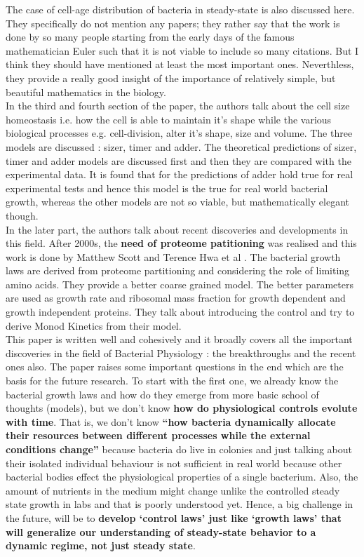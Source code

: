 \documentclass[12pt]{article}
\begin{document}
	The case of cell-age distribution of bacteria in steady-state is also discussed here. They specifically do not mention any papers; they rather say that the work is done by so many people starting from the early days of the famous mathematician Euler such that it is not viable to include so many citations. But I think they should have mentioned at least the most important ones. Neverthless, they provide a really good insight of the importance of relatively simple, but beautiful mathematics in the biology.\\
	
	In the third and fourth section of the paper, the authors talk about the cell size homeostasis i.e. how the cell is able to maintain it's shape while the various biological processes e.g. cell-division, alter it's shape, size and volume. The three models are discussed : sizer, timer and adder. The theoretical predictions of sizer, timer and adder models are discussed first and then they are compared with the experimental data. It is found that for the predictions of adder hold true for real experimental tests and hence this model is the true for real world bacterial growth, whereas the other models are not so viable, but mathematically elegant though.\\

	In the later part, the authors talk about recent discoveries and developments in this field. After 2000s, the \textbf{need of proteome patitioning} was realised and this work is done by Matthew Scott and Terence Hwa et al \cite{2010,2014}. The bacterial growth laws are derived from proteome partitioning and considering the role of limiting amino acids. They provide a better coarse grained model. The better parameters are used as growth rate and ribosomal mass fraction for growth dependent and growth independent proteins. They talk about introducing the control and try to derive Monod Kinetics from their model.\\
    
    This paper is written well and cohesively and it broadly covers all the important discoveries in the field of Bacterial Physiology : the breakthroughs and the recent ones also. The paper raises some important questions in the end which are the basis for the future research. To start with the first one, we already know the bacterial growth laws and how do they emerge from more basic school of thoughts (models), but we don't know \textbf{how do physiological controls evolute with time}. That is, we don't know \textbf{``how bacteria dynamically allocate their resources between different processes while the external conditions change''} because bacteria do live in colonies and just talking about their isolated individual behaviour is not sufficient in real world because other bacterial bodies effect the physiological properties of a single bacterium. Also, the amount of nutrients in the medium might change unlike the controlled steady state growth in labs and that is poorly understood yet. Hence, a big challenge in the future, will be to \textbf{develop `control laws’ just like `growth laws’ that will generalize our understanding of steady-state behavior to a dynamic regime, not just steady state}.\\
\end{document}

